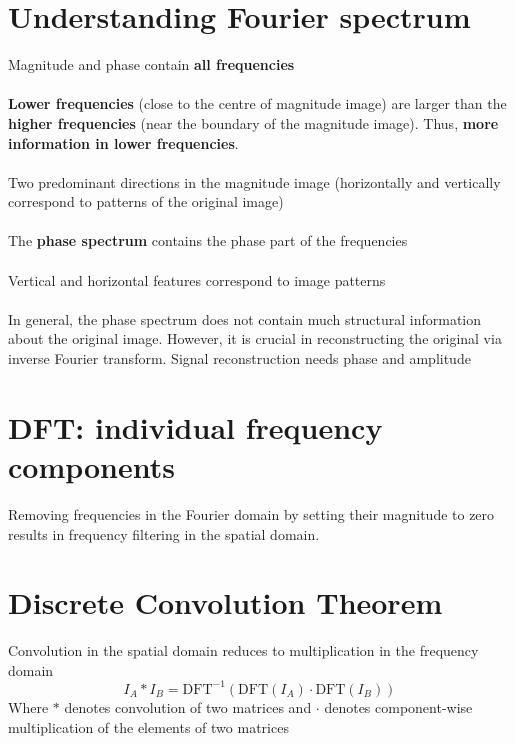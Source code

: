 \documentclass{article}[18pt]
\begin{document}
\section{Understanding Fourier spectrum}
Magnitude and phase contain \textbf{all frequencies}\\
\\
\textbf{Lower frequencies} (close to the centre of magnitude image) are larger than the \textbf{higher frequencies} (near the boundary of the magnitude image). Thus, \textbf{more information in lower frequencies}.\\
\\
Two predominant directions in the magnitude image (horizontally and vertically correspond to patterns of the original image)\\
\\
The \textbf{phase spectrum} contains the phase part of the frequencies\\
\\
Vertical and horizontal features correspond to image patterns\\
\\
In general, the phase spectrum does not contain much structural information about the original image. However, it is crucial in reconstructing the original via inverse Fourier transform. Signal reconstruction needs phase and amplitude
\section{DFT: individual frequency components}
Removing frequencies in the Fourier domain by setting their magnitude to zero results in frequency filtering in the spatial domain.
\section{Discrete Convolution Theorem}
Convolution in the spatial domain reduces to multiplication in the frequency domain
\[
I_{A} * I_{B}=\mathrm{DFT}^{-1}\left(\mathrm{DFT}\left(I_{A}\right) \cdot \mathrm{DFT}\left(I_{B}\right)\right)
\]
Where $*$ denotes convolution of two matrices and $\cdot$ denotes component-wise multiplication of the elements of two matrices
\end{document}
